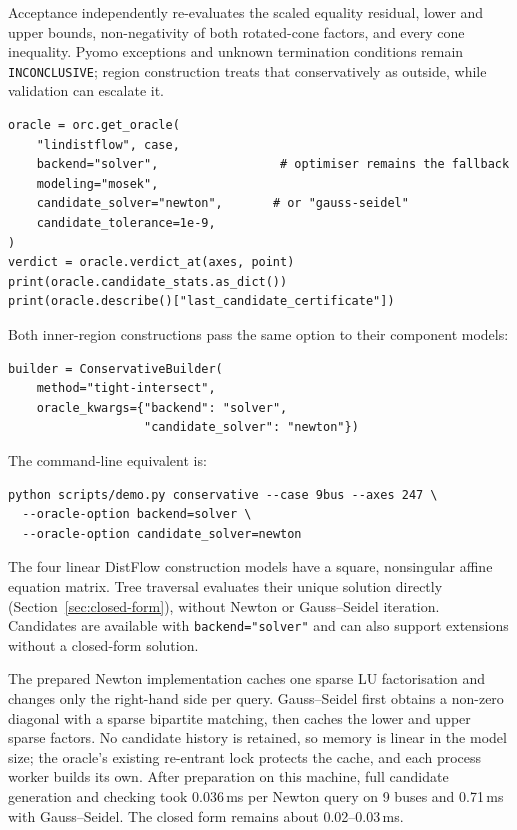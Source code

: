 \documentclass[11pt,a4paper]{report}
\newcommand{\why}[1]{\par\medskip\begingroup\noindent #1\par\endgroup\medskip}
\newcommand{\code}[1]{\texttt{\small #1}}
\begin{document}
Acceptance independently re-evaluates the scaled equality residual, lower and
upper bounds, non-negativity of both rotated-cone factors, and every cone
inequality. Pyomo exceptions and unknown termination conditions remain
\code{INCONCLUSIVE}; region construction treats that conservatively as outside,
while validation can escalate it.

\begin{lstlisting}
oracle = orc.get_oracle(
    "lindistflow", case,
    backend="solver",                 # optimiser remains the fallback
    modeling="mosek",
    candidate_solver="newton",       # or "gauss-seidel"
    candidate_tolerance=1e-9,
)
verdict = oracle.verdict_at(axes, point)
print(oracle.candidate_stats.as_dict())
print(oracle.describe()["last_candidate_certificate"])
\end{lstlisting}

Both inner-region constructions pass the same option to their component
models:

\begin{lstlisting}
builder = ConservativeBuilder(
    method="tight-intersect",
    oracle_kwargs={"backend": "solver",
                   "candidate_solver": "newton"})
\end{lstlisting}

The command-line equivalent is:

\begin{lstlisting}[style=sh]
python scripts/demo.py conservative --case 9bus --axes 247 \
  --oracle-option backend=solver \
  --oracle-option candidate_solver=newton
\end{lstlisting}

\why{The four linear DistFlow construction models have a square, nonsingular
affine equation matrix. Tree traversal evaluates their unique solution
directly (Section~\ref{sec:closed-form}), without Newton or Gauss--Seidel
iteration. Candidates are available with \code{backend="solver"} and can also
support extensions without a closed-form solution.}

The prepared Newton implementation caches one sparse LU factorisation and
changes only the right-hand side per query. Gauss--Seidel first obtains a
non-zero diagonal with a sparse bipartite matching, then caches the lower and
upper sparse factors. No candidate history is retained, so memory is linear in
the model size; the oracle's existing re-entrant lock protects the cache, and
each process worker builds its own. After preparation on this machine, full
candidate generation and checking took 0.036\,ms per Newton query on
9 buses and 0.71\,ms with Gauss--Seidel. The closed form remains about
0.02--0.03\,ms.
\end{document}
